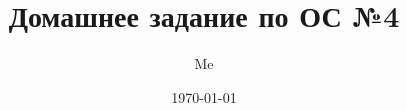 \documentclass[12pt,a4paper,oneside]{article}
\title{Домашнее задание по ОС №4}
\author{Me}
\date{\today}
\begin{document}
  \sloppy
  \maketitle
  \tableofcontents
  \clearpage

  
  
\end{document}
